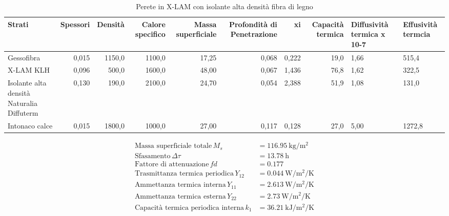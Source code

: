 \begin{table}
\centering
\caption{Perete in X-LAM con isolante alta densità fibra di legno}
\begin{tabular}{lrrrrrrr}
\toprule
                                    Strati & Spessori & Densità & Calore specifico & Massa superficiale & Profondità di Penetrazione &     xi & Capacità termica & Diffusività termica x 10-7 & Effusività termcia \\
\midrule
                                Gessofibra &    0,015 &  1150,0 &           1100,0 &              17,25 &                      0,068 &  0,222 &             19,0 &                       1,66 &              515,4 \\
                                 X-LAM KLH &    0,096 &   500,0 &           1600,0 &              48,00 &                      0,067 &  1,436 &             76,8 &                       1,62 &              322,5 \\
 Isolante alta densità Naturalia Diffuterm &    0,130 &   190,0 &           2100,0 &              24,70 &                      0,054 &  2,388 &             51,9 &                       1,08 &              131,0 \\
                            Intonaco calce &    0,015 &  1800,0 &           1000,0 &              27,00 &                      0,117 &  0,128 &             27,0 &                       5,00 &             1272,8 \\
\bottomrule
\end{tabular}
\end{table}

\begin{flushleft}
\begin{align*}
\text{Massa superficiale totale} \, M_s &= \SI{116.95}{\kilo\gram\per\metre\squared}\\
\text{Sfasamento} \, \Delta\tau &= \SI{13.78}{\hour}\\
\text{Fattore di attenuazione} \, fd &= \SI{0.177}{}\\
\text{Trasmittanza termica periodica} \, Y_{12} &= \SI{0.044}{\watt\per\metre\squared\per\kelvin}\\
\text{Ammettanza termica interna} \, Y_{11} &= \SI{2.613}{\watt\per\metre\squared\per\kelvin}\\
\text{Ammettanza termica esterna} \, Y_{22} &= \SI{2.73}{\watt\per\metre\squared\per\kelvin}\\
\text{Capacità termica periodica interna} \, k_1 &= \SI{36.21}{\kilo\joule\per\metre\squared\per\kelvin}\\
\end{align*}
\end{flushleft}

